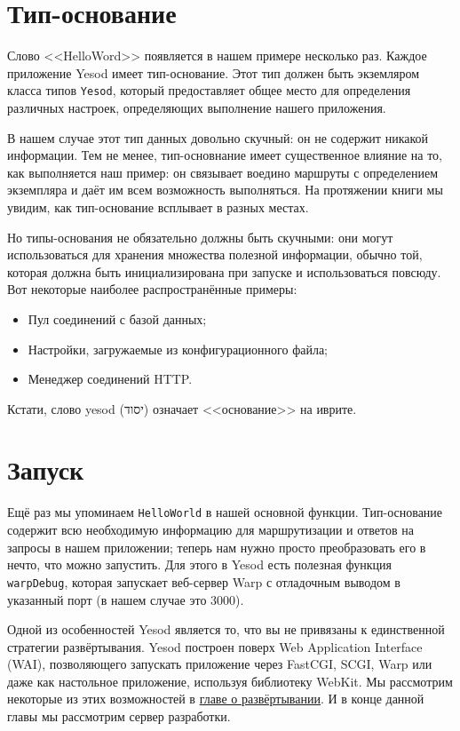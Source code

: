 \section{Тип-основание}

Слово <<HelloWord>> появляется в нашем примере несколько раз. Каждое приложение Yesod
имеет тип-основание. Этот тип должен быть экземляром класса типов \lstinline!Yesod!,
который предоставляет общее место для определения различных настроек, определяющих
выполнение нашего приложения.

В нашем случае этот тип данных довольно скучный: он не содержит никакой информации. Тем не
менее, тип-основнание имеет существенное влияние на то, как выполняется наш пример: он
связывает воедино маршруты с определением экземпляра и даёт им всем возможность
выполняться. На протяжении книги мы увидим, как тип-основание всплывает в разных местах.

Но типы-основания не обязательно должны быть скучными: они могут использоваться для
хранения множества полезной информации, обычно той, которая должна быть инициализирована
при запуске и использоваться повсюду. Вот некоторые наиболее распространённые примеры:

\begin{itemize}
  \item Пул соединений с базой данных;
  \item Настройки, загружаемые из конфигурационного файла;
  \item Менеджер соединений HTTP.
\end{itemize}

\begin{remark}
  Кстати, слово yesod (\textsf{יסוד}) означает <<основание>> на иврите.
\end{remark}

\section{Запуск}

Ещё раз мы упоминаем \lstinline!HelloWorld! в нашей основной функции. Тип-основание
содержит всю необходимую информацию для маршрутизации и ответов на запросы в нашем
приложении; теперь нам нужно просто преобразовать его в нечто, что можно запустить. Для
этого в Yesod есть полезная функция \lstinline!warpDebug!, которая запускает веб-сервер
Warp с отладочным выводом в указанный порт (в нашем случае это 3000).

Одной из особенностей Yesod является то, что вы не привязаны к единственной стратегии
развёртывания. Yesod построен поверх Web Application Interface (WAI), позволяющего
запускать приложение через FastCGI, SCGI, Warp или даже как настольное приложение,
используя библиотеку WebKit. Мы рассмотрим некоторые из этих возможностей в
\hyperref[chap:deploying]{главе о развёртывании}. И в конце данной главы мы рассмотрим сервер
разработки.

